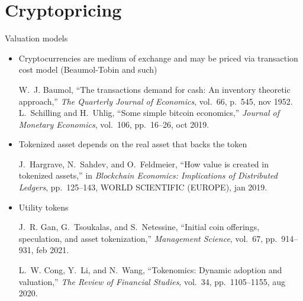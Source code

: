 \documentclass{beamer}
\begin{document}
\section{Cryptopricing}
\begin{frame}{Valuation models}
\begin{itemize}
\item Cryptocurrencies are medium of exchange and may be priced via transaction cost model (Beaumol-Tobin and such)

\scriptsize
\begin{thebibliography}{1}
W.~J. Baumol, ``The transactions demand for cash: An inventory theoretic
  approach,'' {\em The Quarterly Journal of Economics}, vol.~66, p.~545, nov
  1952.
L.~Schilling and H.~Uhlig, ``Some simple bitcoin economics,'' {\em Journal of
  Monetary Economics}, vol.~106, pp.~16--26, oct 2019.
\end{thebibliography}
\normalsize
\item Tokenized asset depends on the real asset that backs the token
\scriptsize
\begin{thebibliography}{1}

J.~Hargrave, N.~Sahdev, and O.~Feldmeier, ``How value is created in tokenized
  assets,'' in {\em Blockchain Economics: Implications of Distributed Ledgers},
  pp.~125--143, {WORLD} {SCIENTIFIC} ({EUROPE}), jan 2019.

\end{thebibliography}
\normalsize
\item Utility tokens
\scriptsize
\begin{thebibliography}{1}

J.~R. Gan, G.~Tsoukalas, and S.~Netessine, ``Initial coin offerings,
  speculation, and asset tokenization,'' {\em Management Science}, vol.~67,
  pp.~914--931, feb 2021.

L.~W. Cong, Y.~Li, and N.~Wang, ``Tokenomics: Dynamic adoption and valuation,''
  {\em The Review of Financial Studies}, vol.~34, pp.~1105--1155, aug 2020.

\end{thebibliography}

\end{itemize}
\end{frame}
\end{document}

